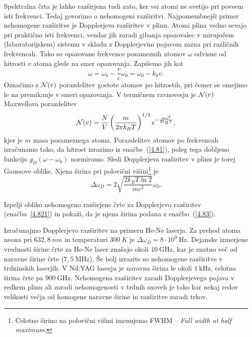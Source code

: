 Spektralna črta je lahko razširjena tudi zato, ker vsi atomi ne svetijo
pri povsem isti frekvenci. Tedaj govorimo o nehomogeni 
razširitvi.
Najpomembnejši primer nehomogene razširitve je Dopplerjeva 
 razširitev v plinu. 
Atomi plina vedno sevajo pri praktično isti frekvenci, vendar jih zaradi gibanja
opazovalec v mirujočem (laboratorijskem) sistemu v skladu z Dopplerjevim pojavom 
zazna pri različnih frekvencah. Tako so opazovane frekvence posameznih atomov $\omega$
odvisne od hitrosti $v$ atoma glede na smer opazovanja. Zapišemo jih kot  
\begin{equation}
\omega=\omega_{0}-\frac{v}{c}\omega_{0}=\omega_{0}-k_{0}v.
\label{4.81}
\end{equation}
Označimo z ${\cal N}(v)$ porazdelitev gostote atomov po hitrostih, pri čemer se omejimo 
le na premikanje v smeri opazovanja. V termičnem ravnovesju je ${\cal N}(v)$
Maxwellova porazdelitev
\begin{equation}
{\cal N}(v)=\frac{N}{V}\left(\frac{m}{2\pi k_{B}T}\right)^{1/2}e^{-\frac{mv^{2}}{2k_{B}T}},
\label{4.82}
\end{equation}
kjer je $m$ masa posameznega atoma.
Porazdelitev atomov po frekvencah izračunamo tako, da hitrost izrazimo
iz enačbe~(\ref{4.81}), poleg tega dobljeno funkcijo $g_{D}(\omega-\omega_0)$
normiramo. Sledi
Dopplerjeva razširitev v plinu je torej Gaussove oblike.
Njena širina pri polovični 
višini\footnote{Celotno širino na polovični višini imenujemo FWHM -- \it{Full width at half maximum}.} je
\begin{equation} 
\Delta\omega_{D}=2 \sqrt{\frac{2k_{B}T \ln 2}{mc^{2}}}\omega_{0}.
\label{4.83}
\end{equation}
\begin{definition}
Izpelji obliko nehomogeno razširjene črte za Dopplerjevo razširitev (enačba~\ref{4.821})
in pokaži, da je njena širina podana z enačbo~(\ref{4.83}).
\end{definition}

Izračunajmo Dopplerjevo razširitev na primeru He-Ne laserja. Za prehod
atoma neona pri $632,8~\si{nm}$ in temperaturi $300~\si{K}$ je 
$\Delta\omega_{D}=8\cdot10^{9}~\si{\hertz}$. Dejanske izmerjene vrednosti širine 
črte za He-Ne laser 
znašajo okoli $10~\si{\giga\hertz}$, kar je znatno več od naravne širine
črte ($7,5~\si{\mega\hertz}$). Še bolj izrazite so nehomogene razširitve v trdninskih laserjih.
V Nd:YAG laserju je naravna širina le okoli $1~\si{\kilo\hertz}$, celotna širina črte
pa $900~\si{\giga\hertz}$. Nehomogena razširitev zaradi Dopplerjevega pojava v 
redkem plinu ali zaradi nehomogenosti v trdnih snoveh je tako kar nekaj redov velikosti 
večja od homogene naravne širine in razširitve zaradi trkov.

